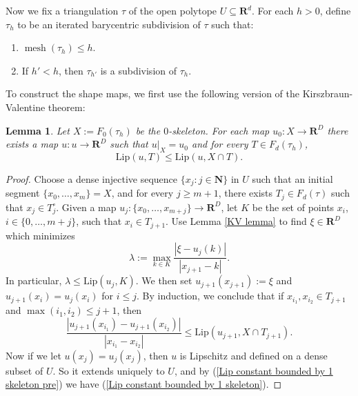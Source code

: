 \documentclass[reqno,11pt]{amsart}
\newcommand{\NN}{\mathbf{N}}
\newcommand{\RR}{\mathbf{R}}
\DeclareMathOperator{\mesh}{mesh}
\newcommand{\Lip}{\mathrm{Lip}}
\newtheorem{lemma}[theorem]{Lemma}
\theoremstyle{definition}
\numberwithin{equation}{section}
\begin{document}
Now we fix a triangulation $\tau$ of the open polytope $U \subseteq \RR^d$.
For each $h > 0$, define $\tau_h$ to be an iterated barycentric subdivision of $\tau$ such that:
\begin{enumerate}
\item $\mesh(\tau_h) \leq h$.
\item If $h' < h$, then $\tau_{h'}$ is a subdivision of $\tau_h$.
\end{enumerate}
To construct the shape maps, we first use the following version of the Kirszbraun-Valentine theorem:

\begin{lemma}\label{convex KV theorem}
Let $X := F_0(\tau_h)$ be the $0$-skeleton.
For each map $u_0: X \to \RR^D$ there exists a map $u: u \to \RR^D$ such that $u|_X = u_0$ and for every $T \in F_d(\tau_h)$,
\begin{equation}\label{Lip constant bounded by 1 skeleton}
\Lip(u, T) \leq \Lip(u, X \cap T).
\end{equation}
\end{lemma}
\begin{proof}
Choose a dense injective sequence $\{x_j: j \in \NN\}$ in $U$ such that an initial segment $\{x_0, \dots, x_m\} = X$, and for every $j \geq m + 1$, there exists $T_j \in F_d(\tau)$ such that $x_j \in T^\circ_j$.
Given a map $u_j: \{x_0, \dots, x_{m + j}\} \to \RR^D$, let $K$ be the set of points $x_i$, $i \in \{0, \dots, m + j\}$, such that $x_i \in T_{j + 1}$.
Use Lemma \ref{KV lemma} to find $\xi \in \RR^D$ which minimizes
$$\lambda := \max_{k \in K} \frac{|\xi - u_j(k)|}{|x_{j + 1} - k|}.$$
In particular, $\lambda \leq \Lip(u_j, K)$.
We then set $u_{j + 1}(x_{j + 1}) := \xi$ and $u_{j + 1}(x_i) = u_j(x_i)$ for $i \leq j$.
By induction, we conclude that if $x_{i_1}, x_{i_2} \in T_{j + 1}$ and $\max(i_1, i_2) \leq j + 1$, then
\begin{equation}\label{Lip constant bounded by 1 skeleton pre}
\frac{|u_{j + 1}(x_{i_1}) - u_{j + 1}(x_{i_2})|}{|x_{i_1} - x_{i_2}|} \leq \Lip(u_{j + 1}, X \cap T_{j + 1}).
\end{equation}
Now if we let $u(x_j) = u_j(x_j)$, then $u$ is Lipschitz and defined on a dense subset of $U$.
So it extends uniquely to $U$, and by (\ref{Lip constant bounded by 1 skeleton pre}) we have (\ref{Lip constant bounded by 1 skeleton}).
\end{proof}
\end{document}
